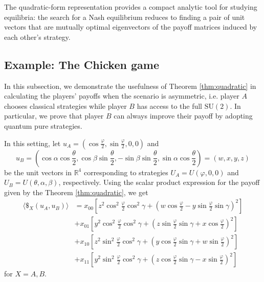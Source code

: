\documentclass[11pt,a4paper,twoside]{article}
\newcommand{\SU}{\mathrm{SU}}
\begin{document}
The quadratic-form representation provides a compact analytic tool for studying equilibria: the search for a Nash equilibrium reduces to finding a pair of unit vectors that are mutually optimal eigenvectors of the payoff matrices induced by each other's strategy.

\subsection{Example: The Chicken game}
In this subsection, we demonstrate the usefulness of Theorem \ref{thm:quadratic} in calculating the players' payoffs when the scenario is asymmetric, i.e. player $A$ chooses classical strategies while player $B$ has access to the full $\SU(2)$. In particular, we prove that player $B$ can always improve their payoff by adopting quantum pure strategies.

 In this setting, let $u_A=(\cos\frac{\varphi}{2},\sin\frac{\varphi}{2},0,0)$ and 
\[
u_B =(\cos\alpha\cos\frac\theta2,\cos\beta\sin\frac\theta2, -\sin\beta\sin\frac\theta2,\sin\alpha\cos\frac\theta2)=(w,x,y,z)
\]
be the unit vectors in $\mathbb{R}^4$ corresponding to strategies $U_A=U(\varphi,0,0)$ and $U_B=U(\theta, \alpha, \beta)$, respectively. Using the scalar product expression for the payoff given by the Theorem \ref{thm:quadratic}, we get
\begin{align}
 \nonumber \langle\$_X(u_A,u_B)\rangle&= x_{00}\left[z^2\cos^2\frac{\varphi}{2}\cos^2\gamma+(w\cos\frac{\varphi}{2}-y\sin\frac{\varphi}{2}\sin\gamma)^2
  \right]\\
  \nonumber &+x_{01}\left[y^2\cos^2\frac{\varphi}{2}\cos^2\gamma+(z\sin\frac{\varphi}{2}\sin\gamma+x\cos\frac{\varphi}{2})^2
  \right]\\
  \nonumber &+x_{10}\left[z^2\sin^2\frac{\varphi}{2}\cos^2\gamma+(y\cos\frac{\varphi}{2}\sin\gamma+w\sin\frac{\varphi}{2})^2
  \right]\\
 \label{formula-payoff-asimm} &+x_{11}\left[y^2\sin^2\frac{\varphi}{2}\cos^2\gamma+(z\cos\frac{\varphi}{2}\sin\gamma-x\sin\frac{\varphi}{2})^2
  \right]
\end{align}
for $X=A,B$.
\end{document}
